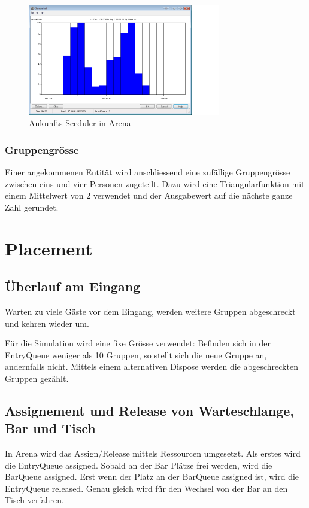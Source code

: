 \documentclass[ngerman,a4paper,12pt]{scrreprt}
\begin{document}
			\begin{figure}[H]
				\centering
					\includegraphics[width=0.75\textwidth]{img/scheduler.png}
					\caption[Arrival Sceduler in Arena]{Ankunfts Sceduler in Arena}
					\label{arrivalSceduler}
			\end{figure}
	
			\subsubsection{Gruppengrösse}
			Einer angekommenen Entität wird anschliessend eine zufällige Gruppengrösse zwischen eins und vier Personen zugeteilt. Dazu wird eine Triangularfunktion mit einem Mittelwert von 2 verwendet und der Ausgabewert auf die nächste ganze Zahl gerundet.
			
	
	\section{Placement}		
		\subsection{Überlauf am Eingang}
			Warten zu viele Gäste vor dem Eingang, werden weitere Gruppen abgeschreckt und kehren wieder um.
		
			Für die Simulation wird eine fixe Grösse verwendet: 			Befinden sich in der EntryQueue weniger als 10 Gruppen, so stellt sich die neue Gruppe an, andernfalls nicht. Mittels einem alternativen Dispose werden die abgeschreckten Gruppen gezählt.
			
			
		\subsection{Assignement und Release von Warteschlange, Bar und Tisch}
			In Arena wird das Assign/Release mittels Ressourcen umgesetzt. Als erstes wird die EntryQueue assigned. Sobald an der Bar Plätze frei werden, wird die BarQueue assigned. Erst wenn der Platz an der BarQueue assigned ist, wird die EntryQueue released. Genau gleich wird für den Wechsel von der Bar an den Tisch verfahren.
	
\end{document}
